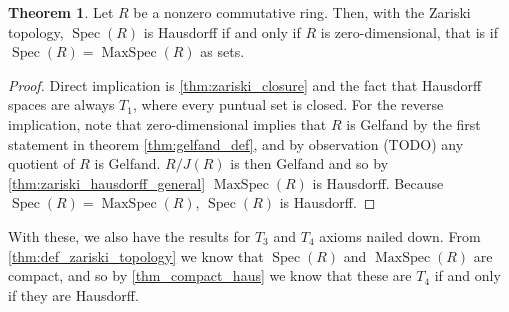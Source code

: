 \documentclass[a4paper]{book}
\theoremstyle{definition}
\newtheorem{theorem}{Theorem}[section]
\theoremstyle{ejemplo}
\theoremstyle{demostracion}
\DeclareMathOperator{\maxspec}{MaxSpec}
\DeclareMathOperator{\spec}{Spec}
\begin{document}
\begin{theorem}
	Let $R$ be a nonzero commutative ring. Then, with the Zariski topology, $\spec(R)$ is Hausdorff if and only if $R$ is zero-dimensional, that is if $\spec(R) = \maxspec(R)$ as sets.
\end{theorem}

\begin{proof}
	Direct implication is \eqref{thm:zariski_closure} and the fact that Hausdorff spaces are always $T_1$, where every puntual set is closed. For the reverse implication, note that zero-dimensional implies that $R$ is Gelfand by the first statement in theorem \eqref{thm:gelfand_def}, and by observation (TODO) any quotient of $R$ is Gelfand. $R/J(R)$ is then Gelfand and so by \eqref{thm:zariski_hausdorff_general} $\maxspec(R)$ is Hausdorff. Because $\spec(R) = \maxspec(R)$, $\spec(R)$ is Hausdorff.
\end{proof}

With these, we also have the results for $T_3$ and $T_4$ axioms nailed down. From \eqref{thm:def_zariski_topology} we know that $\spec(R)$ and $\maxspec(R)$ are compact, and so by \eqref{thm_compact_haus} we know that these are $T_4$ if and only if they are Hausdorff.
\end{document}
